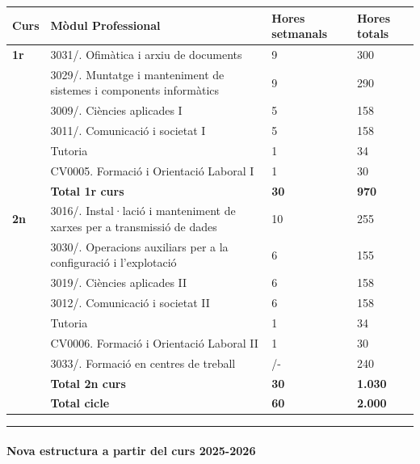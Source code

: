 \documentclass[
  paper=a4,
  ,captions=tableheading
]{scrartcl}
\begin{document}
\begin{longtable}[]{@{}llll@{}}
\toprule
\textbf{Curs} & \textbf{Mòdul Professional} & \textbf{Hores setmanals} &
\textbf{Hores totals} \\
\midrule
\endhead
\textbf{1r} & 3031/. Ofimàtica i arxiu de documents & 9 & 300 \\
& 3029/. Muntatge i manteniment de sistemes i components informàtics & 9
& 290 \\
& 3009/. Ciències aplicades I & 5 & 158 \\
& 3011/. Comunicació i societat I & 5 & 158 \\
& Tutoria & 1 & 34 \\
& CV0005. Formació i Orientació Laboral I & 1 & 30 \\
& \textbf{Total 1r curs} & \textbf{30} & \textbf{970} \\
\textbf{2n} & 3016/. Instal·lació i manteniment de xarxes per a
transmissió de dades & 10 & 255 \\
& 3030/. Operacions auxiliars per a la configuració i l'explotació & 6 &
155 \\
& 3019/. Ciències aplicades II & 6 & 158 \\
& 3012/. Comunicació i societat II & 6 & 158 \\
& Tutoria & 1 & 34 \\
& CV0006. Formació i Orientació Laboral II & 1 & 30 \\
& 3033/. Formació en centres de treball & /- & 240 \\
& \textbf{Total 2n curs} & \textbf{30} & \textbf{1.030} \\
& \textbf{Total cicle} & \textbf{60} & \textbf{2.000} \\
\bottomrule
\end{longtable}

\begin{center}\rule{0.5\linewidth}{0.5pt}\end{center}

\hypertarget{nova-estructura-a-partir-del-curs-2025-2026}{%
\paragraph{\texorpdfstring{\textbf{Nova estructura a partir del curs
2025-2026}}{Nova estructura a partir del curs 2025-2026}}\label{nova-estructura-a-partir-del-curs-2025-2026}}
\end{document}
